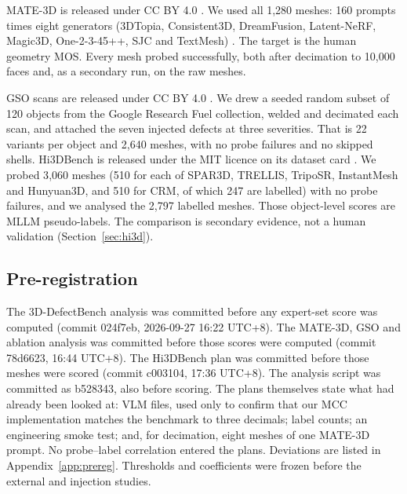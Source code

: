 MATE-3D is released under CC BY 4.0 \citep{zhang2025mate3d}.
We used all 1{,}280 meshes: 160 prompts times eight generators (3DTopia, Consistent3D, DreamFusion, Latent-NeRF, Magic3D, One-2-3-45++, SJC and TextMesh) \citep{hong2024threedtopia,wu2024consistent3d,poole2022dreamfusion,metzer2022latentnerf,lin2023magic3d,liu2023one2345pp,wang2023sjc,tsalicoglou2023textmesh}.
The target is the human geometry MOS.
Every mesh probed successfully, both after decimation to 10{,}000 faces and, as a secondary run, on the raw meshes.

GSO scans are released under CC BY 4.0 \citep{downs2022gso}.
We drew a seeded random subset of 120 objects from the Google Research Fuel collection, welded and decimated each scan, and attached the seven injected defects at three severities.
That is 22 variants per object and 2{,}640 meshes, with no probe failures and no skipped shells.
Hi3DBench is released under the MIT licence on its dataset card \citep{zhang2025hi3deval}.
We probed 3{,}060 meshes (510 for each of SPAR3D, TRELLIS, TripoSR, InstantMesh and Hunyuan3D, and 510 for CRM, of which 247 are labelled) with no probe failures, and we analysed the 2{,}797 labelled meshes.
Those object-level scores are MLLM pseudo-labels.
The comparison is secondary evidence, not a human validation (Section~\ref{sec:hi3d}).

\subsection{Pre-registration}
The 3D-DefectBench analysis was committed before any expert-set score was computed (commit 024f7eb, 2026-09-27 16:22 UTC+8).
The MATE-3D, GSO and ablation analysis was committed before those scores were computed (commit 78d6623, 16:44 UTC+8).
The Hi3DBench plan was committed before those meshes were scored (commit c003104, 17:36 UTC+8).
The analysis script was committed as b528343, also before scoring.
The plans themselves state what had already been looked at: VLM files, used only to confirm that our MCC implementation matches the benchmark to three decimals; label counts; an engineering smoke test; and, for decimation, eight meshes of one MATE-3D prompt.
No probe--label correlation entered the plans.
Deviations are listed in Appendix~\ref{app:prereg}.
Thresholds and coefficients were frozen before the external and injection studies.

